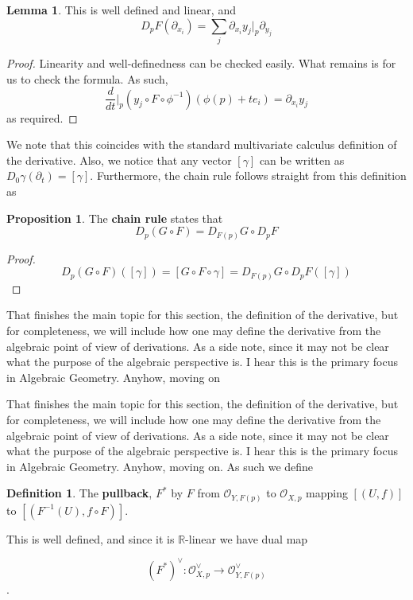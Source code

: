 \documentclass{article}
\theoremstyle{definition}
\newtheorem{definition}{Definition}
\newtheorem{proposition}{Proposition}
\newtheorem{lemma}{Lemma}
\begin{document}
\begin{lemma}
This is well defined and linear, and
$$ D_pF(\partial_{x_i}) = \sum_j \partial_{x_i} y_j|_p \partial_{y_j} $$
\end{lemma}
\begin{proof}
Linearity and well-definedness can be checked easily. What remains is for us to
check the formula. As such,
$$ \frac{d}{dt} |_p (y_j \circ F \circ \phi^{-1}) (\phi(p) + te_i) =
\partial_{x_i} y_j $$
as required.
\end{proof}

We note that this coincides with the standard multivariate calculus definition
of the derivative. Also, we notice that any vector $[\gamma]$ can be written as
$D_0 \gamma(\partial_t) = [\gamma]$. Furthermore, the chain rule follows
straight from this definition as
\begin{proposition}
The \textbf{chain rule} states that
$$ D_p(G \circ F) = D_{F(p)}G \circ D_p F $$
\end{proposition}
\begin{proof}
$$ D_p(G \circ F)([\gamma]) = [G \circ F \circ \gamma] = D_{F(p)}G \circ
D_pF([\gamma]) $$
\end{proof}

That finishes the main topic for this section, the definition of the derivative,
but for completeness, we will include how one may define the derivative from the
algebraic point of view of derivations. As a side note, since it may not be
clear what the purpose of the algebraic perspective is. I hear this is the
primary focus in Algebraic Geometry. Anyhow, moving on

That finishes the main topic for this section, the definition of the derivative,
but for completeness, we will include how one may define the derivative from the
algebraic point of view of derivations. As a side note, since it may not be
clear what the purpose of the algebraic perspective is. I hear this is the
primary focus in Algebraic Geometry. Anyhow, moving on. As such we define

\begin{definition}
The \textbf{pullback}, $F^*$ by $F$ from $\mathcal{O}_{Y, F(p)}$ to $\mathcal{O}_{X,
  p}$ mapping $[(U, f)]$ to $[(F^{-1} (U), f \circ F)]$.
\end{definition}

This is well defined, and since it is $\mathbb{R}$-linear we have dual map

$$ (F^*)^\vee : \mathcal{O}^\vee_{X, p} \to \mathcal{O}^\vee_{Y, F(p)} $$.
\end{document}

